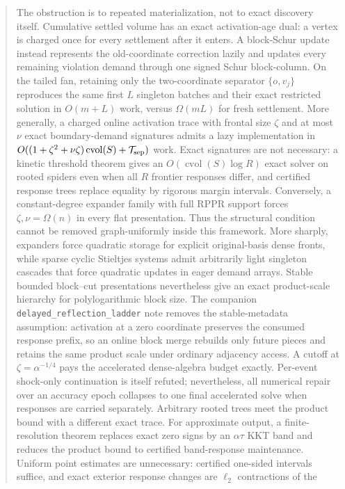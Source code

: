 \documentclass[11pt]{article}
\begin{document}
\begin{abstract}
The obstruction is to repeated materialization, not to exact discovery
itself.  Cumulative settled volume has an exact activation-age dual: a vertex
is charged once for every settlement after it enters.  A block-Schur update
instead represents the old-coordinate correction lazily and updates every
remaining violation demand through one signed Schur block-column.  On the
tailed fan, retaining only the two-coordinate separator
$\{o,v_j\}$ reproduces the same first $L$ singleton batches and their exact
restricted solution in $O(m+L)$ work, versus $\Omega(mL)$ for fresh
settlement.  More generally, a charged online activation trace with frontal
size $\zeta$ and at most $\nu$ exact boundary-demand signatures admits a lazy
implementation in
$O((1+\zeta^2+\nu\zeta)\operatorname{cvol}(S)+\mathcal T_{\rm sep})$ work.
Exact signatures are not necessary: a kinetic threshold theorem gives an
$O(\operatorname{cvol}(S)\log R)$ exact solver on rooted spiders even when all
$R$ frontier responses differ, and certified response trees replace equality
by rigorous margin intervals.  Conversely, a constant-degree expander family
with full RPPR support forces $\zeta,\nu=\Omega(n)$ in every flat presentation.
Thus the structural condition cannot be removed graph-uniformly inside this
framework.  More sharply, expanders force quadratic storage for explicit
original-basis dense fronts, while sparse cyclic Stieltjes systems admit
arbitrarily light singleton cascades that force quadratic updates in eager
demand arrays.  Stable bounded block--cut presentations nevertheless give an
exact product-scale hierarchy for polylogarithmic block size.  The companion
\texttt{delayed\_reflection\_ladder} note removes the stable-metadata
assumption: activation at a zero coordinate preserves the consumed response
prefix, so an online block merge rebuilds only future pieces and retains the
same product scale under ordinary adjacency access.  A cutoff at
$\zeta=\alpha^{-1/4}$ pays the accelerated dense-algebra budget exactly.
Per-event shock-only continuation is itself refuted; nevertheless, all
numerical repair over an accuracy epoch collapses to one final accelerated
solve when responses are carried separately.  Arbitrary rooted trees meet
the product bound with a different exact trace.  For approximate output, a
finite-resolution theorem replaces exact zero signs by an $\alpha\tau$ KKT
band and reduces the product bound to certified band-response maintenance.
Uniform point estimates are unnecessary: certified one-sided intervals
suffice, and exact exterior response changes are $\ell_2$ contractions of the

\end{abstract}
\end{document}
